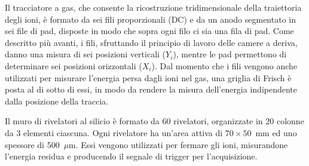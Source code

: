 Il tracciatore a gas, che consente la ricostruzione tridimensionale della traiettoria degli ioni, è formato da sei fili proporzionali (DC) e da un anodo segmentato in sei file di pad, disposte in modo che sopra ogni filo ci sia una fila di pad.
Come descritto più avanti, i fili, sfruttando il principio di lavoro delle camere a deriva, danno una misura di sei posizioni verticali ($Y_i$), mentre le pad permettono di determinare sei posizioni orizzontali ($X_i$).
Dal momento che i fili vengono anche utilizzati per misurare l'energia persa dagli ioni nel gas, una griglia di Frisch è posta al di sotto di essi, in modo da rendere la misura dell'energia indipendente dalla posizione della traccia.




Il muro di rivelatori al silicio è formato da 60 rivelatori, organizzate in 20 colonne da 3 elementi ciascuna. 
Ogni rivelatore ha un'area attiva di $70 \times 50$~mm ed uno spessore di 500~$\mu$m.
Essi vengono utilizzati per fermare gli ioni, misurandone l'energia residua e producendo il segnale di trigger per l'acquisizione. 

